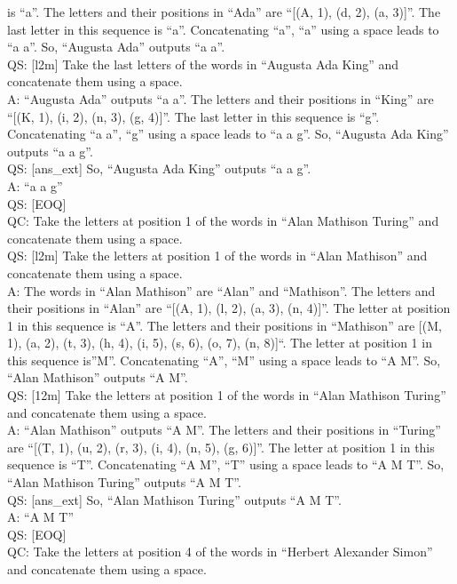 \documentclass[
]{article}
\begin{document}
is ``a''. The letters and their positions in ``Ada'' are ``{[}(A, 1),
(d, 2), (a, 3){]}''. The last letter in this sequence is ``a''.
Concatenating ``a'', ``a'' using a space leads to ``a a''. So, ``Augusta
Ada'' outputs ``a a''.\\
QS: {[}l2m{]} Take the last letters of the words in ``Augusta Ada King''
and concatenate them using a space.\\
A: ``Augusta Ada'' outputs ``a a''. The letters and their positions in
``King'' are ``{[}(K, 1), (i, 2), (n, 3), (g, 4){]}''. The last letter
in this sequence is ``g''. Concatenating ``a a'', ``g'' using a space
leads to ``a a g''. So, ``Augusta Ada King'' outputs ``a a g''.\\
QS: {[}ans\_ext{]} So, ``Augusta Ada King'' outputs ``a a g''.\\
A: ``a a g''\\
QS: {[}EOQ{]}\\
QC: Take the letters at position 1 of the words in ``Alan Mathison
Turing'' and concatenate them using a space.\\
QS: {[}l2m{]} Take the letters at position 1 of the words in ``Alan
Mathison'' and concatenate them using a space.\\
A: The words in ``Alan Mathison'' are ``Alan'' and ``Mathison''. The
letters and their positions in ``Alan'' are ``{[}(A, 1), (l, 2), (a, 3),
(n, 4){]}''. The letter at position 1 in this sequence is ``A''. The
letters and their positions in ``Mathison'' are {[}(M, 1), (a, 2), (t,
3), (h, 4), (i, 5), (s, 6), (o, 7), (n, 8){]}``. The letter at position
1 in this sequence is''M''. Concatenating ``A'', ``M'' using a space
leads to ``A M''. So, ``Alan Mathison'' outputs ``A M''.\\
QS: {[}12m{]} Take the letters at position 1 of the words in ``Alan
Mathison Turing'' and concatenate them using a space.\\
A: ``Alan Mathison'' outputs ``A M''. The letters and their positions in
``Turing'' are ``{[}(T, 1), (u, 2), (r, 3), (i, 4), (n, 5), (g, 6){]}''.
The letter at position 1 in this sequence is ``T''. Concatenating ``A
M'', ``T'' using a space leads to ``A M T''. So, ``Alan Mathison
Turing'' outputs ``A M T''.\\
QS: {[}ans\_ext{]} So, ``Alan Mathison Turing'' outputs ``A M T''.\\
A: ``A M T''\\
QS: {[}EOQ{]}\\
QC: Take the letters at position 4 of the words in ``Herbert Alexander
Simon'' and concatenate them using a space.\\
\end{document}

